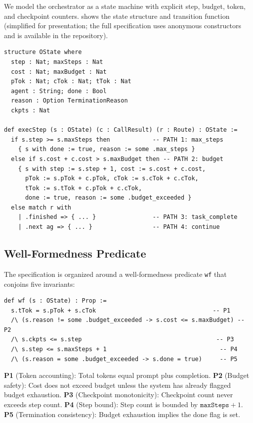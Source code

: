 \documentclass[11pt,a4paper]{article}
\begin{document}
We model the orchestrator as a state machine with explicit step,
budget, token, and checkpoint counters.
 shows the state structure and transition
function (simplified for presentation; the full specification uses
anonymous constructors and is available in the repository).

\begin{lstlisting}[language=Lean4,caption={Orchestrator state and transition function (simplified from repository source).},label=lst:lean-core]
structure OState where
  step : Nat; maxSteps : Nat
  cost : Nat; maxBudget : Nat
  pTok : Nat; cTok : Nat; tTok : Nat
  agent : String; done : Bool
  reason : Option TerminationReason
  ckpts : Nat

def execStep (s : OState) (c : CallResult) (r : Route) : OState :=
  if s.step >= s.maxSteps then            -- PATH 1: max_steps
    { s with done := true, reason := some .max_steps }
  else if s.cost + c.cost > s.maxBudget then -- PATH 2: budget
    { s with step := s.step + 1, cost := s.cost + c.cost,
      pTok := s.pTok + c.pTok, cTok := s.cTok + c.cTok,
      tTok := s.tTok + c.pTok + c.cTok,
      done := true, reason := some .budget_exceeded }
  else match r with
    | .finished => { ... }                -- PATH 3: task_complete
    | .next ag => { ... }                 -- PATH 4: continue
\end{lstlisting}

\subsection{Well-Formedness Predicate}

The specification is organized around a well-formedness predicate
\texttt{wf} that conjoins five invariants:

\begin{lstlisting}[language=Lean4,caption={Well-formedness predicate.},label=lst:wf]
def wf (s : OState) : Prop :=
  s.tTok = s.pTok + s.cTok                                 -- P1
  /\ (s.reason != some .budget_exceeded -> s.cost <= s.maxBudget) -- P2
  /\ s.ckpts <= s.step                                      -- P3
  /\ s.step <= s.maxSteps + 1                                -- P4
  /\ (s.reason = some .budget_exceeded -> s.done = true)     -- P5
\end{lstlisting}

\noindent
\textbf{P1} (Token accounting): Total tokens equal prompt plus
completion. \textbf{P2} (Budget safety): Cost does not exceed budget
unless the system has already flagged budget exhaustion. \textbf{P3}
(Checkpoint monotonicity): Checkpoint count never exceeds step count.
\textbf{P4} (Step bound): Step count is bounded by
$\texttt{maxSteps} + 1$. \textbf{P5} (Termination consistency):
Budget exhaustion implies the done flag is set.
\end{document}
